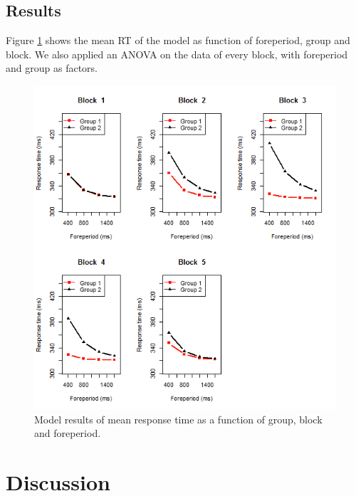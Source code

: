 \documentclass[10pt,letterpaper]{article}
\begin{document}
\subsection{Results}
Figure \ref{5blocks} shows the mean RT of the model as function of foreperiod, group and block. We also applied an ANOVA on the data of every block, with foreperiod and group as factors. 
\begin{figure}
	\centering
	\includegraphics[width=\columnwidth]{5blocks2.png}
	\caption{Model results of mean response time as a function of group, block and foreperiod.}
	\label{5blocks}
\end{figure}

\section{Discussion}




\setlength{\bibleftmargin}{.125in}
\setlength{\bibindent}{-\bibleftmargin}

\end{document}
